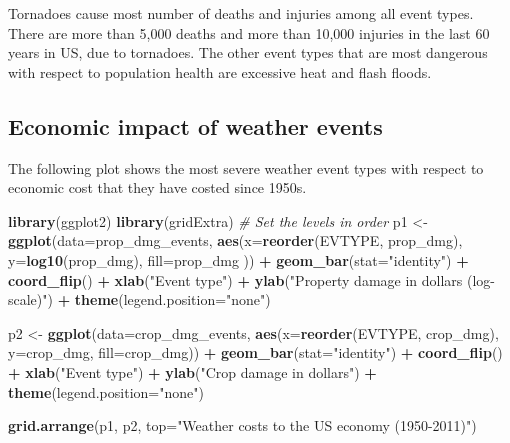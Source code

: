 \documentclass[]{article}
\newenvironment{Shaded}{\begin{snugshade}}{\end{snugshade}}
\newcommand{\KeywordTok}[1]{\textcolor[rgb]{0.13,0.29,0.53}{\textbf{#1}}}
\newcommand{\DataTypeTok}[1]{\textcolor[rgb]{0.13,0.29,0.53}{#1}}
\newcommand{\StringTok}[1]{\textcolor[rgb]{0.31,0.60,0.02}{#1}}
\newcommand{\CommentTok}[1]{\textcolor[rgb]{0.56,0.35,0.01}{\textit{#1}}}
\newcommand{\OperatorTok}[1]{\textcolor[rgb]{0.81,0.36,0.00}{\textbf{#1}}}
\newcommand{\NormalTok}[1]{#1}
\begin{document}
Tornadoes cause most number of deaths and injuries among all event
types. There are more than 5,000 deaths and more than 10,000 injuries in
the last 60 years in US, due to tornadoes. The other event types that
are most dangerous with respect to population health are excessive heat
and flash floods.

\subsection{Economic impact of weather
events}\label{economic-impact-of-weather-events}

The following plot shows the most severe weather event types with
respect to economic cost that they have costed since 1950s.

\begin{Shaded}
\begin{Highlighting}[]
\KeywordTok{library}\NormalTok{(ggplot2)}
\KeywordTok{library}\NormalTok{(gridExtra)}
\CommentTok{# Set the levels in order}
\NormalTok{p1 <-}\StringTok{ }\KeywordTok{ggplot}\NormalTok{(}\DataTypeTok{data=}\NormalTok{prop_dmg_events,}
             \KeywordTok{aes}\NormalTok{(}\DataTypeTok{x=}\KeywordTok{reorder}\NormalTok{(EVTYPE, prop_dmg), }\DataTypeTok{y=}\KeywordTok{log10}\NormalTok{(prop_dmg), }\DataTypeTok{fill=}\NormalTok{prop_dmg )) }\OperatorTok{+}
\StringTok{    }\KeywordTok{geom_bar}\NormalTok{(}\DataTypeTok{stat=}\StringTok{"identity"}\NormalTok{) }\OperatorTok{+}
\StringTok{    }\KeywordTok{coord_flip}\NormalTok{() }\OperatorTok{+}
\StringTok{    }\KeywordTok{xlab}\NormalTok{(}\StringTok{"Event type"}\NormalTok{) }\OperatorTok{+}
\StringTok{    }\KeywordTok{ylab}\NormalTok{(}\StringTok{"Property damage in dollars (log-scale)"}\NormalTok{) }\OperatorTok{+}
\StringTok{    }\KeywordTok{theme}\NormalTok{(}\DataTypeTok{legend.position=}\StringTok{"none"}\NormalTok{)}

\NormalTok{p2 <-}\StringTok{ }\KeywordTok{ggplot}\NormalTok{(}\DataTypeTok{data=}\NormalTok{crop_dmg_events,}
             \KeywordTok{aes}\NormalTok{(}\DataTypeTok{x=}\KeywordTok{reorder}\NormalTok{(EVTYPE, crop_dmg), }\DataTypeTok{y=}\NormalTok{crop_dmg, }\DataTypeTok{fill=}\NormalTok{crop_dmg)) }\OperatorTok{+}
\StringTok{    }\KeywordTok{geom_bar}\NormalTok{(}\DataTypeTok{stat=}\StringTok{"identity"}\NormalTok{) }\OperatorTok{+}
\StringTok{    }\KeywordTok{coord_flip}\NormalTok{() }\OperatorTok{+}\StringTok{ }
\StringTok{    }\KeywordTok{xlab}\NormalTok{(}\StringTok{"Event type"}\NormalTok{) }\OperatorTok{+}
\StringTok{    }\KeywordTok{ylab}\NormalTok{(}\StringTok{"Crop damage in dollars"}\NormalTok{) }\OperatorTok{+}\StringTok{ }
\StringTok{    }\KeywordTok{theme}\NormalTok{(}\DataTypeTok{legend.position=}\StringTok{"none"}\NormalTok{)}

\KeywordTok{grid.arrange}\NormalTok{(p1, p2, }\DataTypeTok{top=}\StringTok{"Weather costs to the US economy (1950-2011)"}\NormalTok{)}
\end{Highlighting}
\end{Shaded}
\end{document}
